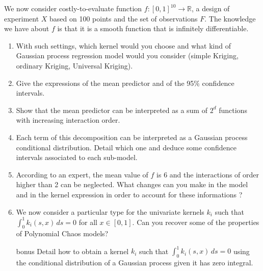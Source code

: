 \documentclass[11pt]{scrartcl}
\begin{document}
\noindent We now consider costly-to-evaluate function $f: [0,1]^{10} \to \mathds{R}$, a design of experiment $X$ based on 100 points and the set of observations $F$. The knowledge we have about $f$ is that it is a smooth function that is infinitely differentiable. 

\begin{enumerate}[resume]
\item With such settings, which kernel would you choose and what kind of Gaussian process regression model would you consider (simple Kriging, ordinary Kriging, Universal Kriging).  
\item Give the expressions of the mean predictor and of the 95\% confidence intervals.  
\item Show that the mean predictor can be interpreted as a sum of $2^d$ functions with increasing interaction order.
\item Each term of this decomposition can be interpreted as a Gaussian process conditional distribution. Detail which one and deduce some confidence intervals associated to each sub-model.
\item According to an expert, the mean value of $f$ is 6 and the interactions of order higher than 2 can be neglected. What changes can you make in the model and in the kernel expression in order to account for these informations ?
\item We now consider a particular type for the univariate kernels $k_i$ such that $\int_0^1 k_i(s,x) \, ds = 0$ for all $x \in [0,1]$. Can you recover some of the properties of Polynomial Chaos models?
\item[bonus] Detail how to obtain a kernel $k_i$ such that $\int_0^1 k_i(s,x) \, ds = 0$ using the conditional distribution of a Gaussian process given it has zero integral.
\end{enumerate} 
\end{document}
